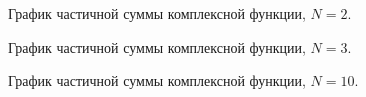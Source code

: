 \documentclass[a5paper, 10pt]{article}
\theoremstyle{definition}
\theoremstyle{plain}
\theoremstyle{remark}
\begin{document}
\begin{figure}[h]
\caption{График частичной суммы комплексной функции, $N=2$.}
\end{figure}

\begin{figure}[h]
\caption{График частичной суммы комплексной функции, $N=3$.}
\end{figure}

\begin{figure}[h]
\caption{График частичной суммы комплексной функции, $N=10$.}
\end{figure}
\end{document}
